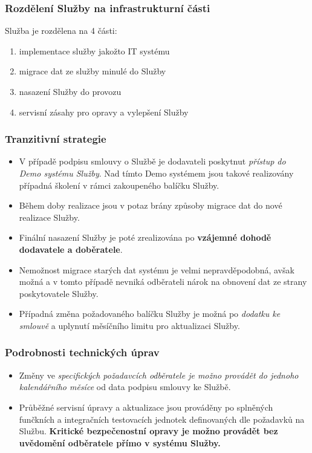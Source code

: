 \documentclass[11pt, a4paper, titlepage]{article}
\begin{document}
	\subsubsection*{Rozdělení Služby na infrastrukturní části}

	Služba je rozdělena na 4 části:
	\begin{enumerate}
		\item implementace služby jakožto IT systému
		\item migrace dat ze služby minulé do Služby
		\item nasazení Služby do provozu
		\item servisní zásahy pro opravy a vylepšení Služby
	\end{enumerate}

	\subsubsection*{Tranzitivní strategie}

	\begin{itemize}
		\item V případě podpisu smlouvy o Službě je dodavateli poskytnut \emph{přístup do Demo systému Služby}. Nad tímto Demo systémem jsou takové realizovány případná školení v rámci zakoupeného balíčku Služby.
		\item Během doby realizace jsou v potaz brány způsoby migrace dat do nové realizace Služby.
		\item Finální nasazení Služby je poté zrealizována po \textbf{vzájemné dohodě dodavatele a doběratele}.
		\item Nemožnost migrace starých dat systému je velmi nepravděpodobná, avšak možná a v tomto případě nevniká odběrateli nárok na obnovení dat ze strany poskytovatele Služby.
		\item Případná změna požadovaného balíčku Služby je možná po \emph{dodatku ke smlouvě} a uplynutí měsíčního limitu pro aktualizaci Služby.
	\end{itemize}

	\subsubsection*{Podrobnosti technických úprav}

	\begin{itemize}
		\item Změny ve \emph{specifických požadavcích odběratele je možno provádět do jednoho kalendářního měsíce} od data podpisu smlouvy ke Službě.
		\item Průběžné servisní úpravy a aktualizace jsou prováděny po splněných funčkních a integračních testovacích jednotek definovaných dle požadavků na Službu. \textbf{Kritické bezpečenostní opravy je možno provádět bez uvědomění odběratele přímo v systému Služby.} 
	\end{itemize}
\end{document}
